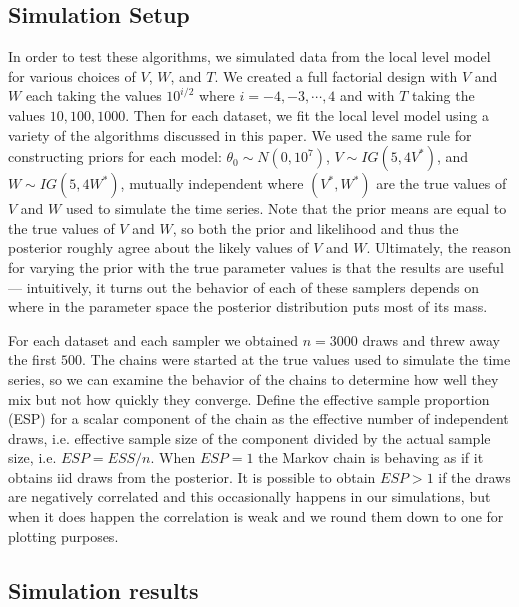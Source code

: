 \documentclass[12pt]{article}
\begin{document}
\subsection{Simulation Setup}

In order to test these algorithms, we simulated data from the local level model for various choices of $V$, $W$, and $T$. We created a full factorial design with $V$ and $W$ each taking the values $10^{i/2}$ where $i=-4,-3,\cdots,4$ and with $T$ taking the values $10, 100, 1000$. Then for each dataset, we fit the local level model using a variety of the algorithms discussed in this paper. We used the same rule for constructing priors for each model: $\theta_0\sim N(0,10^7)$, $V\sim IG(5, 4V^*)$, and $W\sim IG(5, 4W^*)$, mutually independent where $(V^*,W^*)$ are the true values of $V$ and $W$ used to simulate the time series. Note that the prior means are equal to the true values of $V$ and $W$, so both the prior and likelihood and thus the posterior roughly agree about the likely values of $V$ and $W$. Ultimately, the reason for varying the prior with the true parameter values is that the results are useful --- intuitively, it turns out the behavior of each of these samplers depends on where in the parameter space the posterior distribution puts most of its mass.

For each dataset and each sampler we obtained $n=3000$ draws and threw away the first $500$. The chains were started at the true values used to simulate the time series, so we can examine the behavior of the chains to determine how well they mix but not how quickly they converge. Define the effective sample proportion (ESP) for a scalar component of the chain as the effective number of independent draws, i.e. effective sample size \cite{gelman2013bayesian} of the component divided by the actual sample size, i.e. $ESP=ESS/n$. When $ESP=1$ the Markov chain is behaving as if it obtains iid draws from the posterior. It is possible to obtain $ESP>1$ if the draws are negatively correlated and this occasionally happens in our simulations, but when it does happen the correlation is weak and we round them down to one for plotting purposes.

\subsection{Simulation results}
\end{document}
